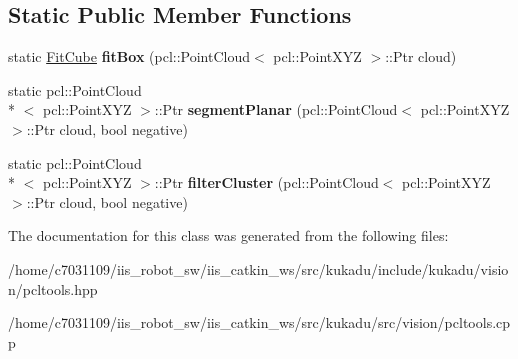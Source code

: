 \subsection*{Static Public Member Functions}
\begin{DoxyCompactItemize}
\item 
\hypertarget{classkukadu_1_1PCLTools_aa5e8b8d3aa40a7370f2dcaa6ecdaa8ab}{static \hyperlink{structkukadu_1_1FitCube}{Fit\-Cube} {\bfseries fit\-Box} (pcl\-::\-Point\-Cloud$<$ pcl\-::\-Point\-X\-Y\-Z $>$\-::Ptr cloud)}\label{classkukadu_1_1PCLTools_aa5e8b8d3aa40a7370f2dcaa6ecdaa8ab}

\item 
\hypertarget{classkukadu_1_1PCLTools_a408c7df54bbd0de648cf0bdb1a4b8548}{static pcl\-::\-Point\-Cloud\\*
$<$ pcl\-::\-Point\-X\-Y\-Z $>$\-::Ptr {\bfseries segment\-Planar} (pcl\-::\-Point\-Cloud$<$ pcl\-::\-Point\-X\-Y\-Z $>$\-::Ptr cloud, bool negative)}\label{classkukadu_1_1PCLTools_a408c7df54bbd0de648cf0bdb1a4b8548}

\item 
\hypertarget{classkukadu_1_1PCLTools_a14c2a6fdf39b8b33f79c068d3a295999}{static pcl\-::\-Point\-Cloud\\*
$<$ pcl\-::\-Point\-X\-Y\-Z $>$\-::Ptr {\bfseries filter\-Cluster} (pcl\-::\-Point\-Cloud$<$ pcl\-::\-Point\-X\-Y\-Z $>$\-::Ptr cloud, bool negative)}\label{classkukadu_1_1PCLTools_a14c2a6fdf39b8b33f79c068d3a295999}

\end{DoxyCompactItemize}


The documentation for this class was generated from the following files\-:\begin{DoxyCompactItemize}
\item 
/home/c7031109/iis\-\_\-robot\-\_\-sw/iis\-\_\-catkin\-\_\-ws/src/kukadu/include/kukadu/vision/pcltools.\-hpp\item 
/home/c7031109/iis\-\_\-robot\-\_\-sw/iis\-\_\-catkin\-\_\-ws/src/kukadu/src/vision/pcltools.\-cpp\end{DoxyCompactItemize}
